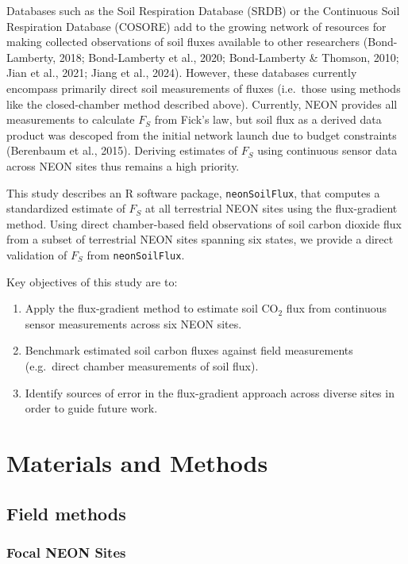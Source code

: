 \documentclass[
  letterpaper,
  DIV=11,
  numbers=noendperiod]{scrartcl}
\providecommand{\tightlist}{%
  \setlength{\itemsep}{0pt}\setlength{\parskip}{0pt}}
\begin{document}
Databases such as the Soil Respiration Database (SRDB) or the Continuous
Soil Respiration Database (COSORE) add to the growing network of
resources for making collected observations of soil fluxes available to
other researchers (Bond-Lamberty, 2018; Bond-Lamberty et al., 2020;
Bond-Lamberty \& Thomson, 2010; Jian et al., 2021; Jiang et al., 2024).
However, these databases currently encompass primarily direct soil
measurements of fluxes (i.e.~those using methods like the closed-chamber
method described above). Currently, NEON provides all measurements to
calculate \(F_{S}\) from Fick's law, but soil flux as a derived data
product was descoped from the initial network launch due to budget
constraints (Berenbaum et al., 2015). Deriving estimates of \(F_{S}\)
using continuous sensor data across NEON sites thus remains a high
priority.

This study describes an R software package, \texttt{neonSoilFlux}, that
computes a standardized estimate of \(F_{S}\) at all terrestrial NEON
sites using the flux-gradient method. Using direct chamber-based field
observations of soil carbon dioxide flux from a subset of terrestrial
NEON sites spanning six states, we provide a direct validation of
\(F_{S}\) from \texttt{neonSoilFlux}.

Key objectives of this study are to:

\begin{enumerate}
\def\labelenumi{\arabic{enumi}.}
\tightlist
\item
  Apply the flux-gradient method to estimate soil CO\(_{2}\) flux from
  continuous sensor measurements across six NEON sites.
\item
  Benchmark estimated soil carbon fluxes against field measurements
  (e.g.~direct chamber measurements of soil flux).
\item
  Identify sources of error in the flux-gradient approach across diverse
  sites in order to guide future work.
\end{enumerate}

\section{Materials and Methods}\label{materials-and-methods}

\subsection{Field methods}\label{field-methods}

\subsubsection{Focal NEON Sites}\label{focal-neon-sites}
\end{document}
